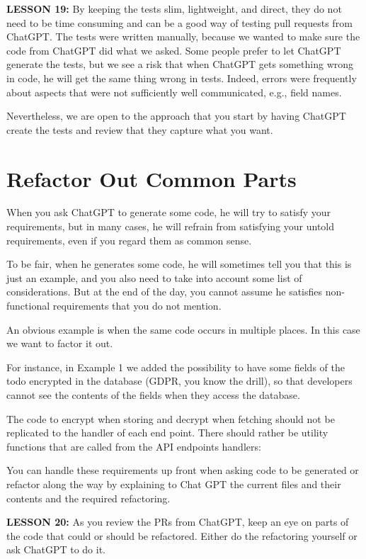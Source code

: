 \documentclass[runningheads]{llncs}
\begin{document}
\textbf{LESSON 19:} By keeping the tests slim, lightweight, and direct, they do not need to be time consuming and can be a good way of testing pull requests from ChatGPT.
The tests were written manually, because we wanted to make sure the code from ChatGPT did what we asked. Some people prefer to let ChatGPT generate the tests, but we see a risk that when ChatGPT gets something wrong in code, he will get the same thing wrong in tests. Indeed, errors were frequently about aspects that were not sufficiently well communicated, e.g., field names.

Nevertheless, we are open to the approach that you start by having ChatGPT create the tests and review that they capture what you want.

\section{Refactor Out Common Parts}
When you ask ChatGPT to generate some code, he will try to satisfy your requirements, but in many cases, he will refrain from satisfying your untold requirements, even if you regard them as common sense.

To be fair, when he generates some code, he will sometimes tell you that this is just an example, and you also need to take into account some list of considerations. But at the end of the day, you cannot assume he satisfies non-functional requirements that you do not mention.

An obvious example is when the same code occurs in multiple places. In this case we want to factor it out.

For instance, in Example 1 we added the possibility to have some fields of the todo encrypted in the database (GDPR, you know the drill), so that developers cannot see the contents of the fields when they access the database.

The code to encrypt when storing and decrypt when fetching should not be replicated to the handler of each end point. There should rather be utility functions that are called from the API endpoints handlers:
 
You can handle these requirements up front when asking code to be generated or refactor along the way by explaining to Chat GPT the current files and their contents and the required refactoring.

\textbf{LESSON 20:} As you review the PRs from ChatGPT, keep an eye on parts of the code that could or should be refactored. Either do the refactoring yourself or ask ChatGPT to do it.
\end{document}
